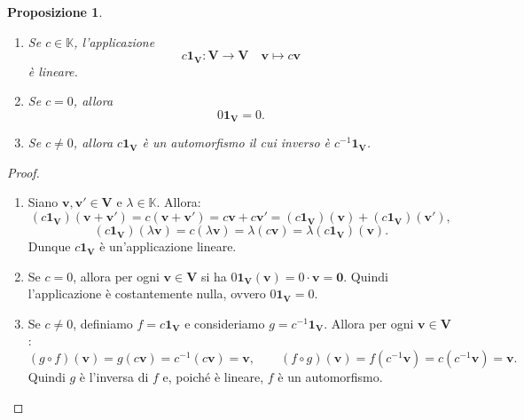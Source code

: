 \documentclass{article}
\theoremstyle{plain}
\newtheorem{prop}[thm]{Proposizione}
\theoremstyle{definition}
\theoremstyle{remark}
\begin{document}
\begin{bxthm}
\begin{prop}\hfill
    \begin{enumerate}
        \item Se $c\in\mathbb{K}$, l'applicazione 
        \[ c\mathbf{1}_\mathbf{V}:\mathbf{V}\to \mathbf{V}\quad\mathbf{v}\mapsto c\mathbf{v} \]
        è lineare.
        \item Se $c=0$, allora \[0\mathbf{1}_\mathbf{V}=\mathit{0}.\]
        \item Se $c\neq0$, allora $c\mathbf{1}_\mathbf{V}$ è un automorfismo il cui inverso è $c^{-1}\mathbf{1}_\mathbf{V}$.
    \end{enumerate}
\end{prop}
\end{bxthm}
\begin{proof}\hfill 
    \begin{enumerate}
        \item Siano $\mathbf{v}, \mathbf{v}' \in \mathbf{V}$ e $\lambda \in \mathbb{K}$. Allora:
        \[
            (c\mathbf{1}_\mathbf{V})(\mathbf{v} + \mathbf{v}') = c(\mathbf{v} + \mathbf{v}') = c\mathbf{v} + c\mathbf{v}' = (c\mathbf{1}_\mathbf{V})(\mathbf{v}) + (c\mathbf{1}_\mathbf{V})(\mathbf{v}'),
        \]
        \[
            (c\mathbf{1}_\mathbf{V})(\lambda \mathbf{v}) = c(\lambda \mathbf{v}) = \lambda(c\mathbf{v}) = \lambda (c\mathbf{1}_\mathbf{V})(\mathbf{v}).
        \]
        Dunque $c\mathbf{1}_\mathbf{V}$ è un'applicazione lineare.
        \item Se $c = 0$, allora per ogni $\mathbf{v} \in \mathbf{V}$ si ha $0\mathbf{1}_\mathbf{V}(\mathbf{v}) = 0\cdot \mathbf{v} = \mathbf{0}$. Quindi l'applicazione è costantemente nulla, ovvero $0\mathbf{1}_\mathbf{V} = \mathit{0}$.
        \item Se $c \neq 0$, definiamo $f = c\mathbf{1}_\mathbf{V}$ e consideriamo $g = c^{-1}\mathbf{1}_\mathbf{V}$. Allora per ogni $\mathbf{v} \in \mathbf{V}$:
        \[
            (g \circ f)(\mathbf{v}) = g(c\mathbf{v}) = c^{-1}(c\mathbf{v}) = \mathbf{v}, \qquad (f \circ g)(\mathbf{v}) = f(c^{-1}\mathbf{v}) = c(c^{-1}\mathbf{v}) = \mathbf{v}.
        \]
        Quindi $g$ è l'inversa di $f$ e, poiché è lineare, $f$ è un automorfismo.
    \end{enumerate}
\end{proof}

\vspace{10pt}
\end{document}
